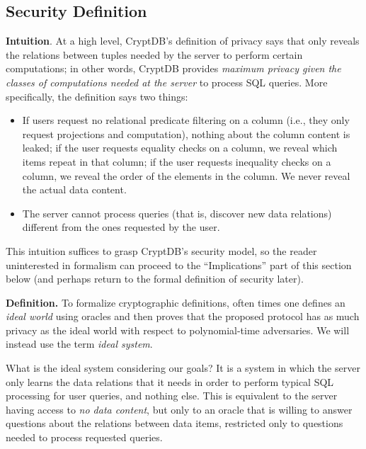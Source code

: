 \subsection{Security Definition}\label{s:def}

\textbf{Intuition}. At a high level, CryptDB's definition of privacy says
that \name{} only reveals the relations between tuples needed by the server
to perform certain computations; in other words, CryptDB provides
\textit{maximum privacy given the classes of computations needed at the
server} to process SQL queries.  More specifically, the definition says
two things:
\vspace{-0.15cm}
\begin{itemize}
  \item If users request no relational predicate filtering 
on a column (i.e., they only request projections and computation),
nothing about the column content is leaked; if the user requests equality checks
on a column, we reveal which items repeat in that column;
if the user requests inequality checks on a column, we reveal the order
of the elements in the column.  We never reveal the actual data content.

\item The server cannot
process queries (that is, discover new data relations) different from the ones
requested by the user.
\end{itemize}
\vspace{-0.15cm}
This intuition suffices to grasp CryptDB's security model, so the
reader uninterested in formalism can proceed to the ``Implications''
part of this section below (and perhaps return to the formal definition
of security later).

\textbf{Definition.}
To formalize cryptographic definitions, often times one defines an
\textit{ideal world} using oracles and then proves that the proposed protocol
has as much privacy as the ideal world with respect to
polynomial-time adversaries. We will instead use the term \textit{ideal
system}.

What is the ideal system considering our goals? It is a system in
which the server only learns the data relations that it needs in order to perform
typical SQL processing for user queries, and nothing else. This is equivalent to
the server having access to \textit{no data content}, but only to an oracle that
is willing to answer questions about the relations between data items, restricted
only to questions needed to process requested queries.

